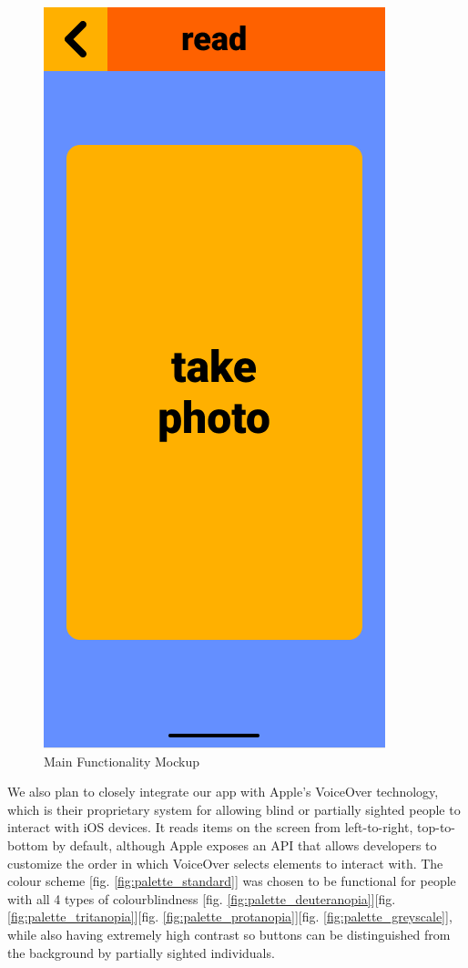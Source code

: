 \documentclass[a4paper,11pt]{article}
\begin{document}
\begin{figure}[H]
\centering
\includegraphics[scale=0.45]{img/read_screen_1.png}
\caption{Main Functionality Mockup}
\label{fig:read_screen}
\end{figure}

\noindent
We also plan to closely integrate our app with Apple's VoiceOver technology, which is their proprietary system for allowing blind or partially sighted people to interact with iOS devices. It reads items on the screen from left-to-right, top-to-bottom by default, although Apple exposes an API that allows developers to customize the order in which VoiceOver selects elements to interact with. The colour scheme [fig. \ref{fig:palette_standard}] was chosen to be functional for people with all 4 types of colourblindness [fig. \ref{fig:palette_deuteranopia}][fig. \ref{fig:palette_tritanopia}][fig. \ref{fig:palette_protanopia}][fig. \ref{fig:palette_greyscale}], while also having extremely high contrast so buttons can be distinguished from the background by partially sighted individuals.
\end{document}
